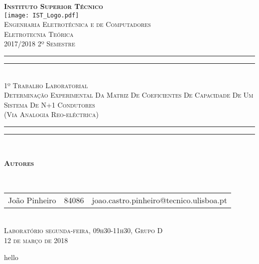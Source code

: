 \documentclass[12pt, a4paper, titlepage, portuguese]{article}
\begin{document}
\begin{titlepage}
	\center
	\textsc{\bfseries\LARGE Instituto Superior Técnico}\\[1cm] %
	\texttt{[image: IST\_Logo.pdf]}\\[2.5cm]

	\textsc{\Large Engenharia Eletrotécnica e de Computadores}\\[0.5cm] %
	\textsc{\Large Eletrotecnia Teórica}\\[0.5cm] %
	\textsc{\large 2017/2018 2º Semestre}\\[2cm]

	\rule{\textwidth}{1.6pt}\vspace*{-\baselineskip}\vspace*{2pt} %
	\rule{\textwidth}{0.4pt}\\[\baselineskip] %
		\textsc{\Huge 1º Trabalho Laboratorial}\\[0.2cm]
		\bigskip
		\textsc{\large Determinação Experimental Da Matriz De Coeficientes De Capacidade De Um Sistema De N+1 Condutores \\
		(Via Analogia Reo-eléctrica)}\\[0.2cm]
	\rule{\textwidth}{0.4pt}\vspace*{-\baselineskip}\vspace{3.2pt} %
	\rule{\textwidth}{1.6pt}\\[6cm]

	\begin{minipage}{0.9\textwidth}
		\begin{flushleft} \large
			\begin{Large}\bfseries\textsc{Autores}\end{Large}\\[0.4cm]
			\begin{tabular}{l l l}
				João Pinheiro				& 84086 & \normalsize joao.castro.pinheiro@tecnico.ulisboa.pt \\
			\end{tabular}
		\end{flushleft}
	\end{minipage}\\[0.5cm]

	\large \textsc{Laboratório segunda-feira, 09h30-11h30, Grupo D\\
	\large 12 de março de 2018}\\[1cm]
	\setcounter{page}{0}
\end{titlepage}

hello



\end{document}
